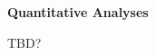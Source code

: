 \documentclass{article}
\begin{document}
\begin{multicols*}{2}




\textbf{Quantitative Analyses}

TBD?

\end{multicols*}
\end{document}
